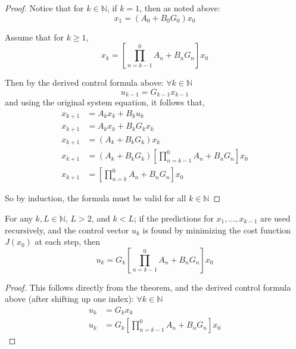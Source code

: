 \documentclass{article}
\begin{document}
\begin{proof}
Notice that for $k\in\mathbb{N}$, if $k=1$, then as noted above:
\[ \boxed{ x_{1} = \left( A_{0} + B_{0} G_{0} \right) x_{0} } \]

Assume that for $k\ge 1$,
\[ x_{k} = \left[ \prod_{n=k-1}^{0} A_{n} + B_{n} G_{n} \right] x_{0} \]

Then by the derived control formula above: $\forall k\in\mathbb{N}$
\[ \boxed{ u_{k-1} = G_{k-1} x_{k-1} } \]
and using the original system equation, it follows that,
\begin{align*}
x_{k+1} &= A_{k}x_{k} + B_{k}u_{k} \\
x_{k+1} &= A_{k}x_{k} + B_{k} G_{k} x_{k} \\
x_{k+1} &= \left( A_{k} + B_{k} G_{k} \right) x_{k} \\
x_{k+1} &= \left( A_{k} + B_{k} G_{k} \right)  \left[ \prod_{n=k-1}^{0} A_{n} + B_{n} G_{n} \right] x_{0} \\
x_{k+1} &= \left[ \prod_{n=k}^{0} A_{n} + B_{n} G_{n} \right] x_{0}
\end{align*}

So by induction, the formula must be valid for all $k\in\mathbb{N}$
\end{proof}

\begin{corollary}
For any $k,L\in\mathbb{N}$, $L>2$, and $k<L$; if the predictions for $x_{1},\dots,x_{k-1}$ are used recursively, and the control vector $u_{k}$ is found by minimizing the cost function $J(x_{0})$ at each step, then
\[ \boxed{ u_{k} = G_{k} \left[ \prod_{n=k-1}^{0} A_{n} + B_{n} G_{n} \right] x_{0} } \]
\end{corollary}

\begin{proof}
This follows directly from the theorem, and the derived control formula above (after shifting up one index): $\forall k\in\mathbb{N}$
\begin{align*}
u_{k} &= G_{k} x_{k} \\
u_{k} &= G_{k} \left[ \prod_{n=k-1}^{0} A_{n} + B_{n} G_{n} \right] x_{0}
\end{align*}
\end{proof}
\end{document}
